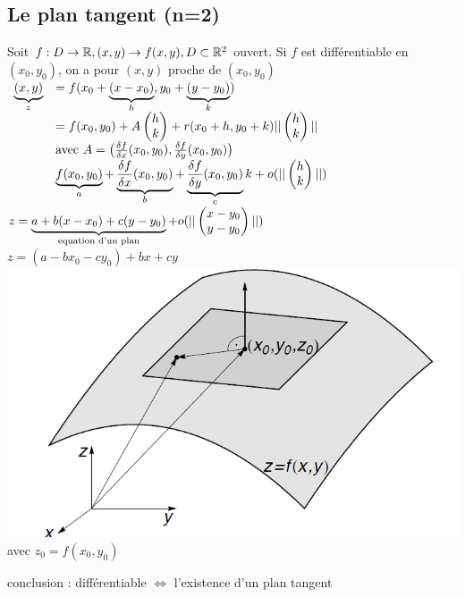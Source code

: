 \documentclass[12pt,a4paper]{article}
\begin{document}
\subsection{Le plan tangent (n=2)}
Soit $f : D\to \mathbb{R}, (x,y) \to f(x,y), D\subset \mathbb{R}^2$ ouvert. Si $f$ est différentiable en $(x_0,y_0)$, on a pour $(x,y)$ proche de $(x_0,y_0)$\\
$\begin{array}{ll}
	\underbrace{(x,y)}_z &= f(x_0 + \underbrace{(x-x_0)}_{h}, y_0 + \underbrace{(y-y_0)}_{k})\\
	&= f(x_0,y_0) + A \begin{pmatrix} h \\ k \end{pmatrix} + r(x_0+h,y_0+k)||\begin{pmatrix} h \\ k \end{pmatrix}||\\
	&\text{avec }A = \big(\frac{\delta f}{\delta x}(x_0,y_0), \frac{\delta f}{\delta y}(x_0,y_0)\big)\\
	& \underbrace{f(x_0,y_0)}_{a} + \underbrace{\frac{\delta f}{\delta x}(x_0,y_0)}_{b} + \underbrace{\frac{\delta f}{\delta y}(x_0,y_0)}_{c}k + o(||\begin{pmatrix} h \\ k \end{pmatrix}||)
\end{array}$\\
$z = \underbrace{a+ b(x-x_0) + c(y-y_0)}_{\text{equation d'un plan}} + o(||\begin{pmatrix} x-y_0 \\ y-y_0 \end{pmatrix}||)$\\
$z = (a-bx_0-cy_0) + bx + cy$\\
\includegraphics[scale=0.3]{images/plan_tangent2} avec $z_0 = f(x_0,y_0)$
\begin{boite}
conclusion : différentiable $ \iff$ l'existence d'un plan tangent
\end{boite}
\end{document}
